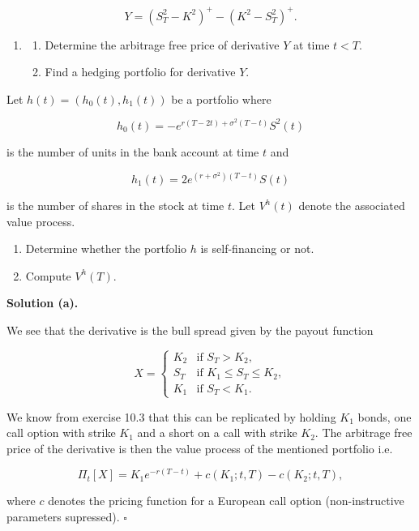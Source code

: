 \documentclass[
]{article}
\providecommand{\tightlist}{%
  \setlength{\itemsep}{0pt}\setlength{\parskip}{0pt}}
\begin{document}
\[
Y=(S^2_T-K^2)^+-(K^2-S^2_T)^+.
\]

\begin{enumerate}
\def\labelenumi{\alph{enumi}.}
\setcounter{enumi}{1}
\item
  \begin{enumerate}
  \def\labelenumii{\roman{enumii}.}
  \tightlist
  \item
    Determine the arbitrage free price of derivative \(Y\) at time
    \(t<T\).
  \item
    Find a hedging portfolio for derivative \(Y\).
  \end{enumerate}
\end{enumerate}

Let \(h(t)=(h_0(t),h_1(t))\) be a portfolio where

\[
h_0(t)=-e^{r(T-2t)+\sigma^2(T-t)}S^2(t)
\]

is the number of units in the bank account at time \(t\) and

\[
h_1(t)=2e^{(r+\sigma^2)(T-t)}S(t)
\]

is the number of shares in the stock at time \(t\). Let \(V^h(t)\)
denote the associated value process.

\begin{enumerate}
\def\labelenumi{\alph{enumi}.}
\setcounter{enumi}{2}
\tightlist
\item
  Determine whether the portfolio \(h\) is self-financing or not.
\item
  Compute \(V^h(T)\).
\end{enumerate}

\textbf{Solution (a).}

We see that the derivative is the bull spread given by the payout
function

\[
X=
\begin{cases}
  K_2 & \text{if }S_T>K_2,\\
  S_T & \text{if }K_1\le S_T\le K_2,\\
  K_1 &\text{if }S_T< K_1.
\end{cases}
\]

We know from exercise 10.3 that this can be replicated by holding
\(K_1\) bonds, one call option with strike \(K_1\) and a short on a call
with strike \(K_2\). The arbitrage free price of the derivative is then
the value process of the mentioned portfolio i.e.

\[
\Pi_t[X]=K_1 e^{-r(T-t)}+c(K_1;t,T)-c(K_2;t,T),
\]

where \(c\) denotes the pricing function for a European call option
(non-instructive parameters supressed). \(\square\)
\end{document}
